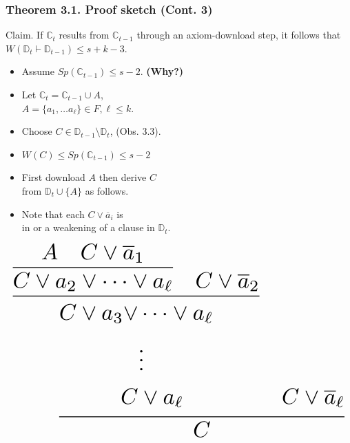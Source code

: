 \documentclass[t,usenames,dvipsnames]{beamer}
\begin{document}
\begin{frame}\frametitle{Theorem 3.1. Proof sketch (Cont. 3)}
	\begin{block}{Claim.}
		If $\mathbb{C}_t$ results from $\mathbb{C}_{t-1}$ through an axiom-download step, it
		follows that $W(\mathbb{D}_t \vdash \mathbb{D}_{t-1}) \leq s + k - 3$.
	\end{block}
	\pause
	\begin{minipage}[t]{0.6\linewidth}
	\begin{itemize}[<+->]
		\item Assume $Sp(\mathbb{C}_{t-1}) \leq s - 2$. \textbf{(Why?)}
		\item Let $\mathbb{C}_t = \mathbb{C}_{t-1} \cup A$,\\
			$A = \{a_1, \dots a_{\ell}\} \in F, \ell \leq k$.
		\item Choose $C \in \mathbb{D}_{t-1} \setminus \mathbb{D}_t$, (Obs. 3.3).
		\item[] $W(C) \leq Sp(\mathbb{C}_{t-1}) \leq s-2$ 
		\item First download $A$ then derive $C$\\
			from $\mathbb{D}_{t} \cup \{A\}$ as follows.
		\item Note that each $C \lor \overline a_i$ is\\
			in or a weakening of a clause in $\mathbb{D}_t$.
	\end{itemize}
	\end{minipage}%
	\hfill%
	\begin{minipage}[t]{0.39\linewidth}
	\pause
	$$
	\resizebox{\hsize}{!}{%
	\infer{C}{
		\infer{\begin{aligned}C \lor a_3 \lor& \dots \lor a_{\ell}\\ &\vdots\\ C &\lor
		a_{\ell} \end{aligned}}
		{
			\infer{C \lor a_2 \lor \dots \lor a_{\ell}}
			{A & C\lor \overline a_1}
		     	&C \lor \overline a_2
		}
	& \begin{aligned}\vphantom{A}\\ \vphantom{\vdots}\\ C \lor \overline
	a_{\ell}\end{aligned}}%
	}
	$$
	\end{minipage}
\end{frame}
\end{document}
